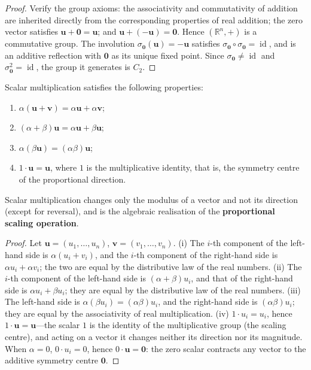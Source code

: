 \begin{proof}
Verify the group axioms: the associativity and commutativity of addition are inherited directly from the corresponding properties of real addition; the zero vector satisfies $\mathbf{u} + \mathbf{0} = \mathbf{u}$; and $\mathbf{u} + (-\mathbf{u}) = \mathbf{0}$. Hence $(\mathbb{R}^n, +)$ is a commutative group. The involution $\sigma_{\mathbf{0}}(\mathbf{u}) = -\mathbf{u}$ satisfies $\sigma_{\mathbf{0}} \circ \sigma_{\mathbf{0}} = \operatorname{id}$, and is an additive reflection with $\mathbf{0}$ as its unique fixed point. Since $\sigma_{\mathbf{0}} \neq \operatorname{id}$ and $\sigma_{\mathbf{0}}^2 = \operatorname{id}$, the group it generates is $C_2$.
\end{proof}

\begin{proposition}\label{prop:scalar_multiplication}
Scalar multiplication satisfies the following properties:
\begin{enumerate}[label=(\roman*)]
    \item $\alpha(\mathbf{u} + \mathbf{v}) = \alpha\mathbf{u} + \alpha\mathbf{v}$;
    \item $(\alpha + \beta)\mathbf{u} = \alpha\mathbf{u} + \beta\mathbf{u}$;
    \item $\alpha(\beta\mathbf{u}) = (\alpha\beta)\mathbf{u}$;
    \item $1 \cdot \mathbf{u} = \mathbf{u}$, where $1$ is the multiplicative identity, that is, the symmetry centre of the proportional direction.
\end{enumerate}
Scalar multiplication changes only the modulus of a vector and not its direction (except for reversal), and is the algebraic realisation of the \textbf{proportional scaling operation}.
\end{proposition}

\begin{proof}
Let $\mathbf{u} = (u_1,\dots,u_n)$, $\mathbf{v} = (v_1,\dots,v_n)$. (i) The $i$-th component of the left-hand side is $\alpha(u_i + v_i)$, and the $i$-th component of the right-hand side is $\alpha u_i + \alpha v_i$; the two are equal by the distributive law of the real numbers. (ii) The $i$-th component of the left-hand side is $(\alpha+\beta)u_i$, and that of the right-hand side is $\alpha u_i + \beta u_i$; they are equal by the distributive law of the real numbers. (iii) The left-hand side is $\alpha(\beta u_i) = (\alpha\beta)u_i$, and the right-hand side is $(\alpha\beta)u_i$; they are equal by the associativity of real multiplication. (iv) $1 \cdot u_i = u_i$, hence $1\cdot\mathbf{u} = \mathbf{u}$---the scalar $1$ is the identity of the multiplicative group (the scaling centre), and acting on a vector it changes neither its direction nor its magnitude. When $\alpha = 0$, $0\cdot u_i = 0$, hence $0\cdot\mathbf{u} = \mathbf{0}$: the zero scalar contracts any vector to the additive symmetry centre $\mathbf{0}$.
\end{proof}

